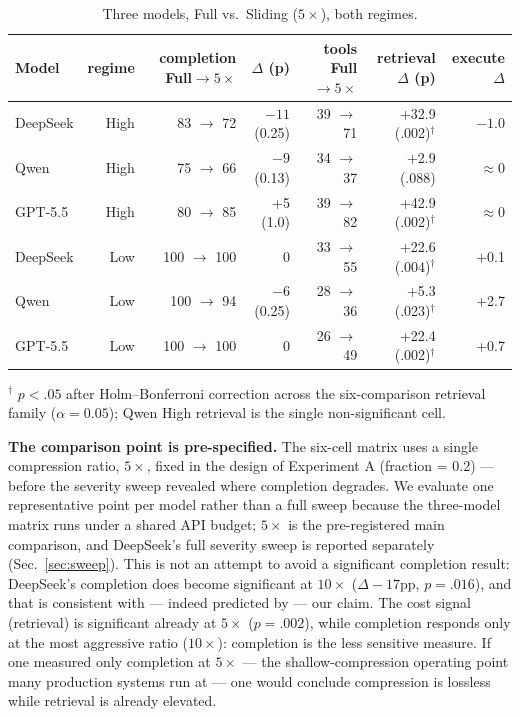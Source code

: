 \documentclass[11pt]{article}
\begin{document}
\begin{table}[t]
\centering
\small
\caption{Three models, Full vs.\ Sliding ($5\times$), both regimes.}
\label{tab:models}
\begin{tabular}{@{}lrrrrrr@{}}
\toprule
Model & regime & completion Full$\to 5\times$ & $\Delta$ (p) & tools Full$\to 5\times$ & retrieval $\Delta$ (p) & execute $\Delta$ \\
\midrule
DeepSeek & High & 83 $\to$ 72 & $-11$ (0.25) & 39 $\to$ 71 & +32.9 (.002)$^\dagger$ & $-1.0$ \\
Qwen & High & 75 $\to$ 66 & $-9$ (0.13) & 34 $\to$ 37 & +2.9 (.088) & $\approx 0$ \\
GPT-5.5 & High & 80 $\to$ 85 & +5 (1.0) & 39 $\to$ 82 & +42.9 (.002)$^\dagger$ & $\approx 0$ \\
DeepSeek & Low & 100 $\to$ 100 & 0 & 33 $\to$ 55 & +22.6 (.004)$^\dagger$ & +0.1 \\
Qwen & Low & 100 $\to$ 94 & $-6$ (0.25) & 28 $\to$ 36 & +5.3 (.023)$^\dagger$ & +2.7 \\
GPT-5.5 & Low & 100 $\to$ 100 & 0 & 26 $\to$ 49 & +22.4 (.002)$^\dagger$ & +0.7 \\
\bottomrule
\end{tabular}

\footnotesize
$^\dagger$ $p < .05$ after Holm--Bonferroni correction across the six-comparison retrieval family
($\alpha = 0.05$); Qwen High retrieval is the single non-significant cell.
\end{table}

\textbf{The comparison point is pre-specified.} The six-cell matrix uses a single compression
ratio, $5\times$, fixed in the design of Experiment A (fraction = 0.2) --- before the severity
sweep revealed where completion degrades. We evaluate one representative point per model
rather than a full sweep because the three-model matrix runs under a shared API budget;
$5\times$ is the pre-registered main comparison, and DeepSeek's full severity sweep is reported
separately (Sec.~\ref{sec:sweep}). This is not an attempt to avoid a significant completion result:
DeepSeek's completion does become significant at $10\times$ ($\Delta-17$pp, $p = .016$), and that is
consistent with --- indeed predicted by --- our claim. The cost signal (retrieval) is
significant already at $5\times$ ($p = .002$), while completion responds only at the most
aggressive ratio ($10\times$): completion is the less sensitive measure. If one measured only
completion at $5\times$ --- the shallow-compression operating point many production systems run
at --- one would conclude compression is lossless while retrieval is already elevated.
\end{document}
